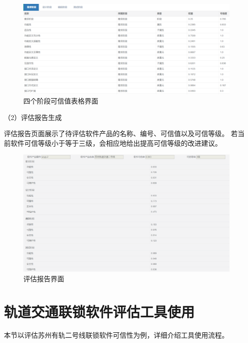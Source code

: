 \begin{figure}[htb]
	\centering
	\includegraphics[width=13cm]{fig/5_09.png}
	\caption{四个阶段可信值表格界面}
	\label{fig:5_09}
\end{figure}

（2）评估报告生成

评估报告页面展示了待评估软件产品的名称、编号、可信值以及可信等级。
若当前软件可信等级小于等于三级，会相应地给出提高可信等级的改进建议。
\begin{figure}[htb]
	\centering
	\includegraphics[width=13cm]{fig/5_10.png}
	\caption{评估报告界面}
	\label{fig:5_10}
\end{figure}

\section{轨道交通联锁软件评估工具使用}
本节以评估苏州有轨二号线联锁软件可信性为例，详细介绍工具使用流程。

